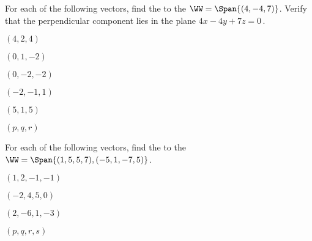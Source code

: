 \begin{exercise}  
For each of the following vectors, find the  to the  \(\WW=\Span\{(4,-4,7)\}\).  
Verify that the perpendicular component lies in the plane \(4x-4y+7z=0\)\,.
\begin{Parts}
\item \((4,2,4)\)

\item \((0,1,-2)\)

\begin{OmitV1}
\item \((0,-2,-2)\)

\item \((-2,-1,1)\)
\end{OmitV1}

\item \((5,1,5)\)

\item \((p,q,r)\)

\end{Parts}
\end{exercise}




\begin{exercise}  
For each of the following vectors, find the  to the  \(\WW=\Span\{(1,5,5,7), (-5,1,-7,5)\}\).  

\begin{Parts}
\item \((1,2,-1,-1)\)

\item \((-2,4,5,0)\)

\item \((2,-6,1,-3)\)

\item \((p,q,r,s)\)

\end{Parts}
\end{exercise}




